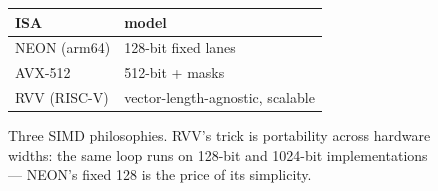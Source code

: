 \begin{figure}[htbp]
\centering
\begin{tabular}{ll}
\toprule
ISA & model \\
\midrule
NEON (arm64) & 128-bit fixed lanes \\
AVX-512 & 512-bit + masks \\
RVV (RISC-V) & vector-length-agnostic, scalable \\
\bottomrule
\end{tabular}
\caption{Three SIMD philosophies. RVV's trick is portability across
hardware widths: the same loop runs on 128-bit and 1024-bit
implementations --- NEON's fixed 128 is the price of its simplicity.}
\label{fig:rvv16}
\end{figure}
